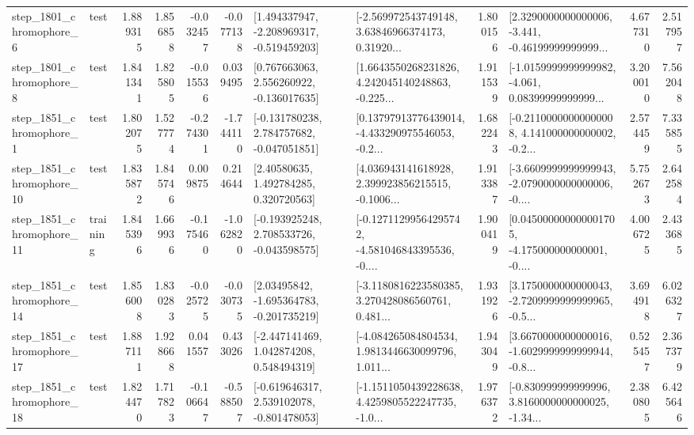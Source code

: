 \begin{tabular}{llrrrrllrlrr}
  step\_1801\_chromophore\_6 &      test &      1.889315 &    1.856858 &     -0.032457 & -0.077138 &   [1.494337947, -2.208969317, -0.519459203] &  [-2.569972543749148, 3.63846966374173, 0.31920... &       1.800156 &  [2.3290000000000006, -3.441, -0.46199999999999... &            4.677310 &          2.517957 \\
  step\_1801\_chromophore\_8 &      test &      1.841341 &    1.825805 &     -0.015536 &  0.039495 &    [0.767663063, 2.556260922, -0.136017635] &  [1.6643550268231826, 4.242045140248863, -0.225... &       1.911539 &  [-1.0159999999999982, -4.061, 0.08399999999999... &            3.200010 &          7.562048 \\
  step\_1851\_chromophore\_1 &      test &      1.802075 &    1.527774 &     -0.274301 & -1.744110 &   [-0.131780238, 2.784757682, -0.047051851] &  [0.13797913776439014, -4.433290975546053, -0.2... &       1.682243 &  [-0.21100000000000008, 4.141000000000002, -0.2... &            2.574459 &          7.335855 \\
 step\_1851\_chromophore\_10 &      test &      1.835872 &    1.845746 &      0.009875 &  0.214644 &      [2.40580635, 1.492784285, 0.320720563] &  [4.036943141618928, 2.399923856215515, -0.1006... &       1.913387 &  [-3.6609999999999943, -2.0790000000000006, -0.... &            5.752673 &          2.642584 \\
 step\_1851\_chromophore\_11 &  training &      1.845396 &    1.669936 &     -0.175460 & -1.062820 &   [-0.193925248, 2.708533726, -0.043598575] &  [-0.12711299564295742, -4.581046843395536, -0.... &       1.900419 &  [0.045000000000001705, -4.175000000000001, -0.... &            4.006725 &          2.433685 \\
 step\_1851\_chromophore\_14 &      test &      1.856008 &    1.830283 &     -0.025725 & -0.030735 &    [2.03495842, -1.695364783, -0.201735219] &  [-3.1180816223580385, 3.270428086560761, 0.481... &       1.931926 &  [3.1750000000000043, -2.7209999999999965, -0.5... &            3.694918 &          6.026327 \\
 step\_1851\_chromophore\_17 &      test &      1.887111 &    1.928668 &      0.041557 &  0.433026 &    [-2.447141469, 1.042874208, 0.548494319] &  [-4.084265084804534, 1.9813446630099796, 1.011... &       1.943049 &  [3.6670000000000016, -1.6029999999999944, -0.8... &            0.525457 &          2.367379 \\
 step\_1851\_chromophore\_18 &      test &      1.824470 &    1.717823 &     -0.106647 & -0.588507 &   [-0.619646317, 2.539102078, -0.801478053] &  [-1.1511050439228638, 4.4259805522247735, -1.0... &       1.976372 &  [-0.830999999999996, 3.8160000000000025, -1.34... &            2.380805 &          6.425646 \\

\end{tabular}
